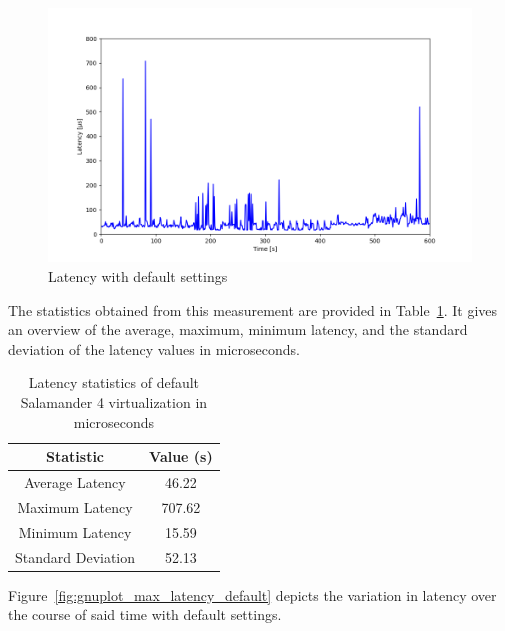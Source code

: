 \documentclass[MMR,Master,english]{twbook}
\begin{document}
\begin{figure}[H]
	\centering
	\includegraphics[width=1.0\columnwidth]{img/max_latency_default.png}
	\caption[Latency with default settings]{Latency with default settings}
	\label{fig:max_latency_default}
\end{figure}

\noindent The statistics obtained from this measurement are provided in Table~\ref{tab:latency_statistics_virt}. It gives an overview of the average, maximum, minimum latency, and the standard deviation of the latency values in microseconds. 

\begin{table}[H]
	\centering
	\caption{Latency statistics of default Salamander 4 virtualization in microseconds}
	\label{tab:latency_statistics_virt}
	\setlength{\tabcolsep}{0.5em} %
	{\renewcommand{\arraystretch}{1.2}%
	\begin{tabular}{|c|c|}\hline
	\textbf{Statistic} & \textbf{Value (\textmu s)} \\\hline
	Average Latency & 46.22 \\\hline
	Maximum Latency & 707.62 \\\hline
	Minimum Latency & 15.59 \\\hline
	Standard Deviation & 52.13 \\\hline
	\end{tabular}}
	\end{table}

\clearpage

\noindent Figure~\ref{fig:gnuplot_max_latency_default} depicts the variation in latency over the course of said time with default settings. 
\end{document}
